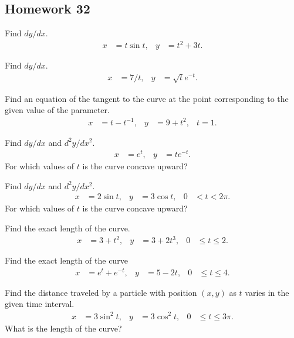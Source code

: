 \subsection{Homework 32}
\begin{problem}[WebAssign HW 32, \# 1]
Find $dy/dx$.
\[
  \begin{aligned}
    x&=t\sin t,&y&=t^2+3t.
  \end{aligned}
\]
\end{problem}
\begin{problem}[WebAssign HW 32, \# 2]
Find $dy/dx$.
\[
  \begin{aligned}
    x&=7/t,&y&=\sqrt{t}e^{-t}.
  \end{aligned}
\]
\end{problem}
\begin{problem}[WebAssign HW 32, \# 3]
Find an equation of the tangent to the curve at the point corresponding to
the given value of the parameter.
\[
\begin{aligned}
x&=t-t^{-1},&y&=9+t^2,&t=1.
\end{aligned}
\]
\end{problem}
\begin{problem}[WebAssign HW 32, \# 4]
Find $dy/dx$ and $d^2y/dx^2$.
\[
  \begin{aligned}
    x&=e^t,&y&=te^{-t}.
  \end{aligned}
\]
For which values of $t$ is the curve concave upward?
\end{problem}
\begin{problem}[WebAssign HW 32, \# 5]
Find $dy/dx$ and $d^2y/dx^2$.
\[
  \begin{aligned}
    x&=2\sin t,&y&=3\cos t,&0&<t<2\pi.
  \end{aligned}
\]
For which values of $t$ is the curve concave upward?
\end{problem}
\begin{problem}[WebAssign HW 32, \# 6]
Find the exact length of the curve.
\[
  \begin{aligned}
    x&=3+t^2,&y&=3+2t^3,&0&\leq t\leq 2.
  \end{aligned}
\]
\end{problem}
\begin{problem}[WebAssign HW 32, \# 7]
Find the exact length of the curve
\[
  \begin{aligned}
    x&=e^t+e^{-t},&y&=5-2t,&0&\leq t\leq 4.
  \end{aligned}
\]
\end{problem}
\begin{problem}[WebAssign HW 32, \# 8]
Find the distance traveled by a particle with position $(x,y)$ as $t$
varies in the given time interval.
\[
  \begin{aligned}
    x&=3\sin^2 t,&y&=3\cos^2 t,&0&\leq t\leq 3\pi.
  \end{aligned}
\]
What is the length of the curve?
\end{problem}

